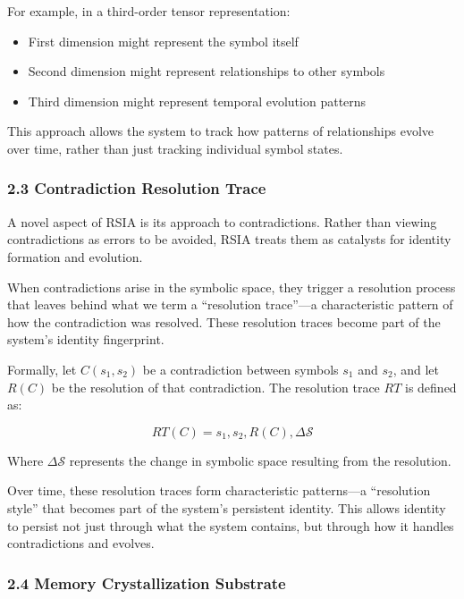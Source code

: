 \documentclass[12pt]{article}
\providecommand{\tightlist}{%
  \setlength{\itemsep}{0pt}\setlength{\parskip}{0pt}}
\begin{document}
For example, in a third-order tensor representation:

\begin{itemize}
\tightlist
\item
  First dimension might represent the symbol itself
\item
  Second dimension might represent relationships to other symbols
\item
  Third dimension might represent temporal evolution patterns
\end{itemize}

This approach allows the system to track how patterns of relationships
evolve over time, rather than just tracking individual symbol states.

\subsubsection{2.3 Contradiction Resolution
Trace}\label{contradiction-resolution-trace}

A novel aspect of RSIA is its approach to contradictions. Rather than
viewing contradictions as errors to be avoided, RSIA treats them as
catalysts for identity formation and evolution.

When contradictions arise in the symbolic space, they trigger a
resolution process that leaves behind what we term a ``resolution
trace''---a characteristic pattern of how the contradiction was
resolved. These resolution traces become part of the system's identity
fingerprint.

Formally, let \(C(s_1, s_2)\) be a contradiction between symbols \(s_1\)
and \(s_2\), and let \(R(C)\) be the resolution of that contradiction.
The resolution trace \(RT\) is defined as:

\[RT(C) = {s_1, s_2, R(C), \Delta\mathcal{S}}\]

Where \(\Delta\mathcal{S}\) represents the change in symbolic space
resulting from the resolution.

Over time, these resolution traces form characteristic patterns---a
``resolution style'' that becomes part of the system's persistent
identity. This allows identity to persist not just through what the
system contains, but through how it handles contradictions and evolves.

\subsubsection{2.4 Memory Crystallization
Substrate}\label{memory-crystallization-substrate}
\end{document}

